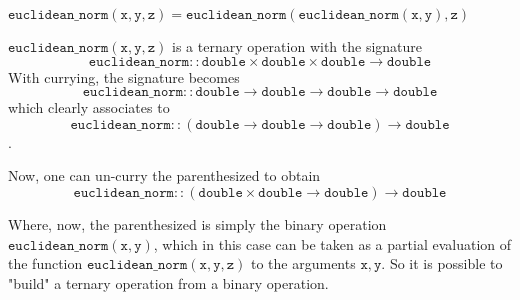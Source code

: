 \begin{Lemma}
    $\mathtt{euclidean\_norm(x, y, z) = euclidean\_norm(euclidean\_norm(x, y), z)}$
\end{Lemma}

\begin{solution}
    $\mathtt{euclidean\_norm(x, y, z)}$ is a ternary operation with the signature
    $$\mathtt{euclidean\_norm :: double \times double \times double \rightarrow double}$$
    With currying, the signature becomes
    $$\mathtt{euclidean\_norm :: double \rightarrow double \rightarrow double \rightarrow double}$$
    which clearly associates to
    $$\mathtt{euclidean\_norm :: \left(double \rightarrow double \rightarrow double\right) \rightarrow double}$$.

    Now, one can un-curry the parenthesized to obtain
    $$\mathtt{euclidean\_norm :: \left(double \times double \rightarrow double\right) \rightarrow double}$$

    Where, now, the parenthesized is simply the binary operation $\mathtt{euclidean\_norm(x, y)}$, which in this case
    can be taken as a partial evaluation of the function $\mathtt{euclidean\_norm(x,y,z)}$ to the arguments
    $\mathtt{x, y}$. So it is possible to "build" a ternary operation from a binary operation.
\end{solution}